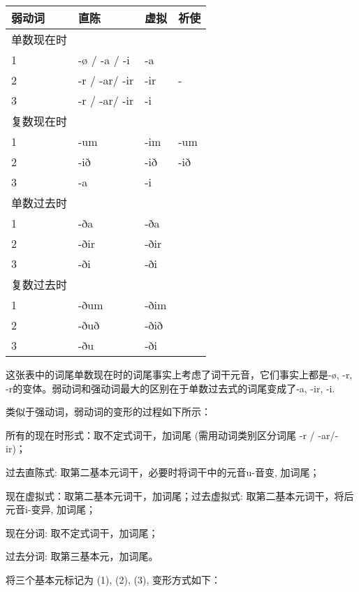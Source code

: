 \begin{longtable}{llll}
    \toprule
    弱动词   & 直陈            & 虚拟   & 祈使  \\
    \midrule
    \endhead
    \bottomrule
    \endfoot
    单数现在时 &               &      &     \\
    1     & -ø / -a / -i  & -a   &     \\
    2     & -r / -ar/ -ir & -ir  & -   \\
    3     & -r / -ar/ -ir & -i   &     \\
    复数现在时 &               &      &     \\
    1     & -um           & -im  & -um \\
    2     & -ið           & -ið  & -ið \\
    3     & -a            & -i   &     \\
    单数过去时 &               &      &     \\
    1     & -ða           & -ða  &     \\
    2     & -ðir          & -ðir &     \\
    3     & -ði           & -ði  &     \\
    复数过去时 &               &      &     \\
    1     & -ðum          & -ðim &     \\
    2     & -ðuð          & -ðið &     \\
    3     & -ðu           & -ði  &     \\
\end{longtable}

这张表中的词尾单数现在时的词尾事实上考虑了词干元音，它们事实上都是-ø, -r, -r的变体。弱动词和强动词最大的区别在于单数过去式的词尾变成了-a, -ir, -i.

类似于强动词，弱动词的变形的过程如下所示：

\begin{info}

    所有的现在时形式：取不定式词干，加词尾 (需用动词类别区分词尾 -r / -ar/-ir)；

    过去直陈式: 取第二基本元词干，必要时将词干中的元音u-音变, 加词尾；

    现在虚拟式：取第二基本元词干，加词尾；过去虚拟式: 取第二基本元词干，将后元音i-变异, 加词尾；

    现在分词: 取不定式词干，加词尾；

    过去分词: 取第三基本元，加词尾。
\end{info}

将三个基本元标记为 (1), (2), (3), 变形方式如下：

